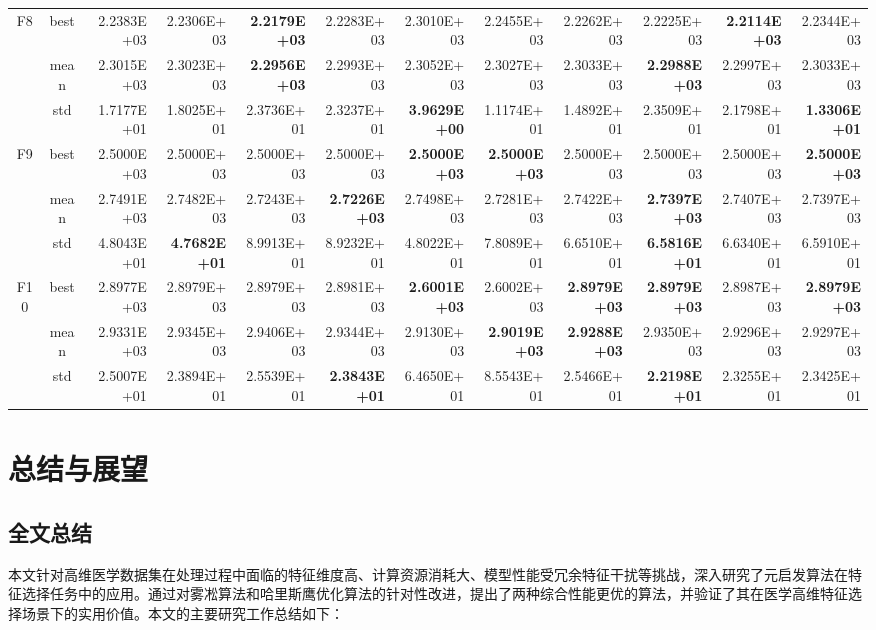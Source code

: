 \documentclass{wzuthesis}
\begin{document}
\begin{landscape}
\begin{table}[htbp]
\begin{tabular}{ccrrrrrrrrrr}
    \multirow{3}[0]{*}{F8} & best  & 2.2383E+03 & 2.2306E+03 & \textbf{2.2179E+03} & 2.2283E+03 & 2.3010E+03 & 2.2455E+03 & 2.2262E+03 & 2.2225E+03 & \textbf{2.2114E+03} & 2.2344E+03 \\
          & mean  & 2.3015E+03 & 2.3023E+03 & \textbf{2.2956E+03} & 2.2993E+03 & 2.3052E+03 & 2.3027E+03 & 2.3033E+03 & \textbf{2.2988E+03} & 2.2997E+03 & 2.3033E+03 \\
          & std   & 1.7177E+01 & 1.8025E+01 & 2.3736E+01 & 2.3237E+01 & \textbf{3.9629E+00} & 1.1174E+01 & 1.4892E+01 & 2.3509E+01 & 2.1798E+01 & \textbf{1.3306E+01} \\
    \multirow{3}[0]{*}{F9} & best  & 2.5000E+03 & 2.5000E+03 & 2.5000E+03 & 2.5000E+03 & \textbf{2.5000E+03} & \textbf{2.5000E+03} & 2.5000E+03 & 2.5000E+03 & 2.5000E+03 & \textbf{2.5000E+03} \\
          & mean  & 2.7491E+03 & 2.7482E+03 & 2.7243E+03 & \textbf{2.7226E+03} & 2.7498E+03 & 2.7281E+03 & 2.7422E+03 & \textbf{2.7397E+03} & 2.7407E+03 & 2.7397E+03 \\
          & std   & 4.8043E+01 & \textbf{4.7682E+01} & 8.9913E+01 & 8.9232E+01 & 4.8022E+01 & 7.8089E+01 & 6.6510E+01 & \textbf{6.5816E+01} & 6.6340E+01 & 6.5910E+01 \\
    \multirow{3}[0]{*}{F10} & best  & 2.8977E+03 & 2.8979E+03 & 2.8979E+03 & 2.8981E+03 & \textbf{2.6001E+03} & 2.6002E+03 & \textbf{2.8979E+03} & \textbf{2.8979E+03} & 2.8987E+03 & \textbf{2.8979E+03} \\
          & mean  & 2.9331E+03 & 2.9345E+03 & 2.9406E+03 & 2.9344E+03 & 2.9130E+03 & \textbf{2.9019E+03} & \textbf{2.9288E+03} & 2.9350E+03 & 2.9296E+03 & 2.9297E+03 \\
          & std   & 2.5007E+01 & 2.3894E+01 & 2.5539E+01 & \textbf{2.3843E+01} & 6.4650E+01 & 8.5543E+01 & 2.5466E+01 & \textbf{2.2198E+01} & 2.3255E+01 & 2.3425E+01 \\
          \bottomrule
    \end{tabular}%
\end{table}%
\end{landscape}

\chapter{总结与展望}

\section{全文总结}
本文针对高维医学数据集在处理过程中面临的特征维度高、计算资源消耗大、模型性能受冗余特征干扰等挑战，深入研究了元启发算法在特征选择任务中的应用。通过对雾凇算法和哈里斯鹰优化算法的针对性改进，提出了两种综合性能更优的算法，并验证了其在医学高维特征选择场景下的实用价值。本文的主要研究工作总结如下：
\end{document}
